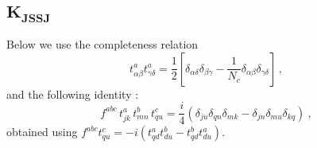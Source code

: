 \documentclass[11pt,a4paper]{article}
\def\beq{\begin{equation}}
\def\eeq{\end{equation}}
\def\beq{\begin{equation}}
\def\eeq{\end{equation}}
\begin{document}
\subsection*{$\mathbf{K_{JSSJ}}$}
 Below we use  the completeness relation 
 \beq\label{completness}
 t_{\alpha\beta}^{a}t_{\gamma\delta}^{a}=\frac{1}{2}\left[\delta_{\alpha\delta}\delta_{\beta\gamma}-\frac{1}{N_{c}}\delta_{\alpha\beta}\delta_{\gamma\delta}\right]\,,
 \eeq
 and the following identity :
 \begin{equation}%
f^{abc}\, t_{jk}^{a}\, t_{mn}^{b}\, t_{qu}^{c}%
=\frac{i}{4}\left(\delta_{ju}\delta_{qn}\delta_{mk}-\delta_{jn}\delta_{mu}\delta_{kq}\right)\label{ttt}\ ,
 \end{equation}
 obtained using $f^{abc}t_{qu}^{c}=-i\left(t_{qd}^{a}t_{du}^{b}-t_{qd}^{b}t_{du}^{a}\right)$.
 
\end{document}
